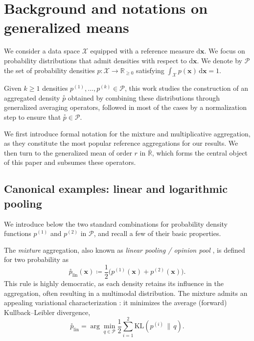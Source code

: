 \documentclass[accepted]{uai2026} %
\newcommand{\R}{\mathbb{R}}
\newcommand{\vx}{\mathbf{x}}
\newcommand{\vd}{\mathrm{d}}
\newcommand{\compose}[1]{\overset{\circ}{#1}}
\begin{document}
\section{Background and notations on generalized means}\label{section: background}
We consider a data space $\mathcal{X}$ equipped with a reference measure $\vd \vx$. We focus on probability distributions that admit densities with respect to $\vd \vx$. We denote by $\mathcal{P}$ the set of probability densities $p : \mathcal{X} \to \mathbb{R}_{\geq 0}$ satisfying $\int_{\mathcal{X}} p(\vx)\, \vd \vx = 1$.

Given $k \geq 1$ densities $p^{(1)}, \dots, p^{(k)} \in \mathcal{P}$, 
this work studies the construction of an aggregated density $\compose{p}$ obtained by combining these distributions through generalized averaging operators, followed in most of the cases by a normalization step to ensure that $\compose{p} \in \mathcal{P}$. 

We first introduce formal notation for the mixture and multiplicative aggregation, as they constitute the most popular reference aggregations for our results. We then turn to the generalized mean of order $r$ in $\overline{\R}$, which forms the central object of this paper and subsumes these operators.

\subsection{Canonical examples: linear and logarithmic pooling} \label{section: canonical examples}

We introduce below the two standard combinations for probability density functions $p^{(1)}$ and $p^{(2)}$ in $\mathcal{P}$, and recall a few of their basic properties.

The \emph{mixture} aggregation, also known as \emph{linear pooling / opinion pool} \citep{stone1961opinion,genest1986characterization,clemen1999combining, elkin2025opinion}, is defined for two probability as
\begin{equation}
\compose{p}_{\text{lin}}(\vx) \coloneqq \frac{1}{2}\Big(p^{(1)}(\vx) + p^{(2)}(\vx)\Big).
\end{equation}
This rule is highly democratic, as each density retains its influence in the aggregation, often resulting in a multimodal distribution. The mixture admits an appealing variational characterization \citep{amari2007integration}: it minimizes the average (forward) Kullback--Leibler divergence,
\begin{equation}\label{eq: mixture minimizes KL}
\compose{p}_{\text{lin}}
= \arg\min_{q \in \mathcal{P}} \frac{1}{2} \sum_{i=1}^2 \mathrm{KL}\!\left(p^{(i)} \,\|\, q\right).
\end{equation}
\end{document}
